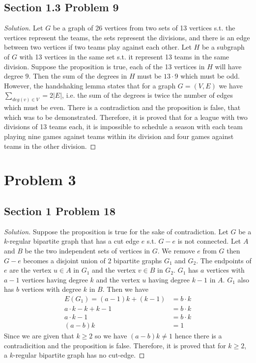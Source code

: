\documentclass[12pt]{article}
\newenvironment*{solution}{\begin{proof}[Solution]}{\end{proof}}
\begin{document}
\subsection*{Section 1.3 Problem 9}
\begin{solution}
    Let \(G\) be a graph of 26 vertices from two sets of 13 vertices s.t. the
    vertices represent the teams, the sets represent the divisions, and there
    is an edge between two vertices if two teams play against each other. Let
    \(H\) be a subgraph of \(G\) with 13 vertices in the same set s.t. it
    represent 13 teams in the same division. Suppose the proposition is true,
    each of the 13 vertices in \(H\) will have degree \(9\). Then the sum of
    the degrees in \(H\) must be \(13\cdot9\) which must be odd. However, the
    handshaking lemma states that for a graph \(G=(V,E)\) we have \(\sum_{deg
    (v)\in V}=2|E|\), i.e. the sum of the degrees is twice the number of edges
    which must be even. There is a contradiction and the proposition is false,
    that which was to be demonstrated. Therefore, it is proved that for a
    league with two divisions of 13 teams each, it is impossible to schedule a
    season with each team playing nine games against teams within its division
    and four games against teams in the other division.
\end{solution}
\section*{Problem 3}
\subsection*{Section 1 Problem 18}
\begin{solution}
    Suppose the proposition is true for the sake of contradiction. Let \(G\)
    be a \(k\)-regular bipartite graph that has a cut edge \(e\) s.t. \(G-e\)
    is not connected. Let \(A\) and \(B\) be the two independent sets of
    vertices in \(G\). We remove \(e\) from \(G\) then \(G-e\) becomes a
    disjoint union of 2 bipartite graphs \(G_1\) and \(G_2\). The endpoints of
    \(e\) are the vertex \(u\in A\) in \(G_1\) and the vertex \(v\in B\) in
    \(G_2\). \(G_1\) has \(a\) vertices with \(a-1\) vertices having degree
    \(k\) and the vertex \(u\) having degree \(k-1\) in \(A\). \(G_1\) also
    has \(b\) vertices with degree \(k\) in \(B\). Then we have
    \begin{align*}
        E(G_1)=(a-1)k+(k-1) &= b\cdot k \\ a\cdot k-k+k-1 &= b\cdot k \\ a
        \cdot k-1 &= b\cdot k \\ (a-b)k &= 1
    \end{align*}
    Since we are given that \(k\geq2\) so we have \((a-b)k\neq1\) hence there
    is a contradicition and the proposition is false. Therefore, it is proved
    that for \(k\geq2\), a \(k\)-regular bipartite graph has no cut-edge.
\end{solution}
\end{document}

